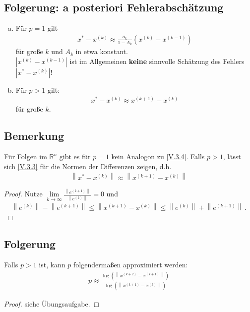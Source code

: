 \documentclass[ngerman,fontsize=11pt, paper=a4, parskip=half, titlepage=true, toc=bib]{scrbook}
\newcommand{\R}{\mathds{R}}
\newcommand{\nn}[1]{\left\| #1 \right\|}
\begin{document}
	\subsection{Folgerung: a posteriori Fehlerabschätzung}
	\begin{enumerate}[a)]
		\item Für $p=1$ gilt
		\begin{gather}
			x^{*}-x^{(k)} \approx \frac{a_k}{1-A_k}(x^{(k)}-x^{(k-1)})
			\label{V.3.4}
		\end{gather}
		für große $k$ und $A_k$ in etwa konstant. \\
		$|x^{(k)}-x^{(k-1)}|$ ist im Allgemeinen \textbf{keine} sinnvolle Schätzung
		des Fehlers $|x^{*}-x^{(k)}|$!
		\item Für $p>1$ gilt:
		\begin{gather}
			x^{*}-x^{(k)} \approx x^{(k+1)}-x^{(k)}
			\label{V.3.5}
		\end{gather}
		für große $k$.
	\end{enumerate}
		
	\subsection{Bemerkung}
	Für Folgen im $\R^n$ gibt es für $p=1$ kein Analogon zu \eqref{V.3.4}.
	Falls $p>1$, lässt sich \eqref{V.3.3} für die Normen der Differenzen zeigen,
	d.h.
	\begin{gather}
		\nn{x^{*}-x^{(k)}} \approx \nn{x^{(k+1)}-x^{(k)}}
		\label{V.3.6}
	\end{gather}
	
	\begin{proof}
		Nutze $\lim\limits_{k\rightarrow\infty} \frac{\nn{e^{(k+1)}}}{\nn{e^{(k)}}} =0$
		und 
		\begin{gather*}
			\nn{e^{(k)}}-\nn{e^{(k+1)}}\leq \nn{x^{(k+1)}-x^{(k)}} \leq \nn{e^{(k)}}+\nn{e^{(k+1)}} \, .
		\end{gather*}
	\end{proof}
	
	\subsection{Folgerung}
	Falls $p>1$ ist, kann $p$ folgendermaßen approximiert werden:
	\begin{gather*}
		p \approx \frac{\log(\nn{x^{(k+2)}-x^{(k+1)}})}{\log(\nn{x^{(k+1)}-x^{(k)}})}
	\end{gather*}
	
	\begin{proof}
		siehe Übungsaufgabe.
	\end{proof}
	
\end{document}
